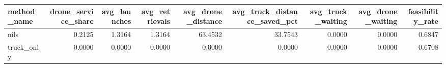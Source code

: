 \begin{tabular}{lrrrrrrrr}
\toprule
method_name & drone_service_share & avg_launches & avg_retrievals & avg_drone_distance & avg_truck_distance_saved_pct & avg_truck_waiting & avg_drone_waiting & feasibility_rate \\
\midrule
nils & 0.2125 & 1.3164 & 1.3164 & 63.4532 & 33.7543 & 0.0000 & 0.0000 & 0.6847 \\
truck_only & 0.0000 & 0.0000 & 0.0000 & 0.0000 & 0.0000 & 0.0000 & 0.0000 & 0.6708 \\
\bottomrule
\end{tabular}
